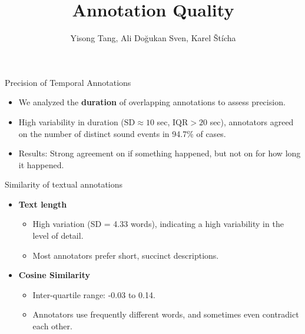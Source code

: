 \documentclass[aspectratio=169, 10pt]{beamer}
\title{Annotation Quality}
\date{}
\author{Yisong Tang, Ali Doğukan Sven, Karel Štícha}
\begin{document}
\maketitle

\begin{frame}{Precision of Temporal Annotations}
\begin{itemize}
    \item We analyzed the \textbf{duration} of overlapping annotations to assess precision.
    \item High variability in duration (\( \text{SD} \approx 10 \) sec, \( \text{IQR} > 20 \) sec), annotators agreed on the number of distinct sound events in 94.7\% of cases.
    \item Results: Strong agreement on if something happened, but not on for how long it happened.
\end{itemize}
\end{frame}



\begin{frame}{Similarity of textual annotations}
    \begin{itemize}
        \item \textbf{Text length}
            \begin{itemize}
                \item High variation (SD = 4.33 words), indicating a high variability in the level of detail.
                \item Most annotators prefer short, succinct descriptions.
            \end{itemize}

        \vspace{.5cm}
        \item \textbf{Cosine Similarity}
            \begin{itemize}
                \item Inter-quartile range: -0.03 to 0.14.
                \item Annotators use frequently different words, and sometimes even contradict each other.
            \end{itemize}        
    \end{itemize}
\end{frame}
\end{document}
